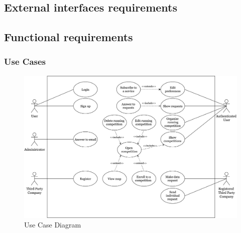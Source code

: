 \documentclass[../main.tex]{subfiles}
\begin{document}
\subsection{External interfaces requirements}
\subsection{Functional requirements}
	\subsubsection{Use Cases}
	\begin{figure}[htbp]
		\centering
		\includegraphics[scale=.052]{images/useCaseTrackMe.png}
		\caption{Use Case Diagram \label{fig:Use Case Diagram}}
	\end{figure}
\end{document}
